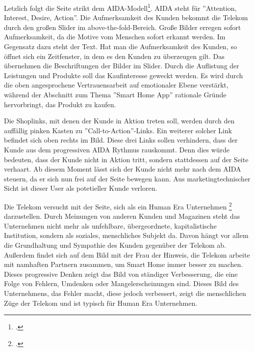 Letzlich folgt die Seite strikt dem AIDA-Modell\footcite[vgl.][]{AIDA}. AIDA steht für ''Attention, Interest, Desire, Action''. Die Aufmerksamkeit des Kunden bekommt die Telekom durch den großen Slider im above-the-fold-Bereich. Große Bilder erregen sofort Aufmerksamkeit, da die Motive vom Menschen sofort erkannt werden. Im Gegensatz dazu steht der Text. Hat man die Aufmerksamkeit des Kunden, so öffnet sich ein Zeitfenster, in dem es den Kunden zu überzeugen gilt. Das übernehmen die Beschriftungen der Bilder im Slider. Durch die Auflistung der Leistungen und Produkte soll das Kaufinteresse geweckt werden. Es wird durch die oben angesprochene Vertrauensarbeit auf emotionaler Ebene verstärkt, während der Abschnitt zum Thema ''Smart Home App'' rationale Gründe hervorbringt, das Produkt zu kaufen.

Die Shoplinks, mit denen der Kunde in Aktion treten soll, werden durch den auffällig pinken Kasten zu ''Call-to-Action''-Links. Ein weiterer solcher Link befindet sich oben rechts im Bild. Diese drei Links sollen verhindern, dass der Kunde aus dem progressiven AIDA Rythmus rauskommt. Denn dies würde bedeuten, dass der Kunde nicht in Aktion tritt, sondern stattdessen auf der Seite verhaart. Ab diesem Moment lässt sich der Kunde nicht mehr nach dem AIDA steuern, da er sich nun frei auf der Seite bewegen kann. Aus marketingtechnischer Sicht ist dieser User als potetieller Kunde verloren.

Die Telekom versucht mit der Seite, sich als ein Human Era Unternehmen \footcite[vgl.][]{humanEra} darzustellen. Durch Meinungen von anderen Kunden und Magazinen steht das Unternehmen nicht mehr als unfehlbare, übergeordnete, kapitalistische Institution, sondern als soziales, menschliches Subjekt da. Davon hängt vor allem die Grundhaltung und Sympathie des Kunden gegenüber der Telekom ab. Außerdem findet sich auf dem Bild mit der Frau der Hinweis, die Telekom arbeite mit namhaften Partnern zusammen, um Smart Home immer besser zu machen. Dieses progressive Denken zeigt das Bild von ständiger Verbesserung, die eine Folge von Fehlern, Umdenken oder Mangelerscheinungen sind. Dieses Bild des Unternehmens, das Fehler macht, diese jedoch verbessert, zeigt die menschlichen Züge der Telekom und ist typisch für Human Era Unternehmen.

